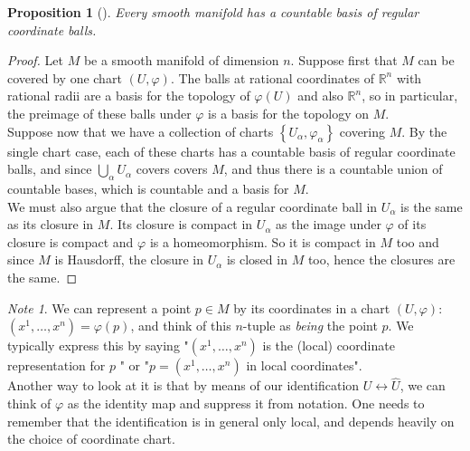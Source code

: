 \documentclass[reqno]{amsart}
\theoremstyle{plain}%
\newtheorem{proposition}[theorem]{Proposition}
\theoremstyle{definition}
\theoremstyle{remark}
\newtheorem*{note}{Note}
\begin{document}
        \begin{proposition}[]\label{regular-coordinate-ball-basis}
        Every smooth manifold has a countable basis of regular coordinate balls.
        \end{proposition}

        \begin{proof}
        Let $M$ be a smooth manifold of dimension $n$. Suppose first that
        $M$ can be covered by one chart $\left( U, \varphi \right) $. 
        The balls at rational coordinates of $\mathbb{R}^{n}$ with rational
        radii are a basis for the topology of $\varphi(U)$ and also
        $\mathbb{R}^{n}$, so in particular, the preimage of these balls under
        $\varphi$ is a basis for the topology on $M$.\\
        Suppose now that we have a collection of charts
        $\left\{ U_{\alpha}, \varphi_{\alpha} \right\} $ covering $M$.
        By the single chart case, each of these charts has a countable basis of
        regular coordinate balls, and since $\bigcup_{\alpha} U_{\alpha}$ covers
        covers $M$, and thus there is a countable union of countable bases, which
        is countable and a basis for $M$.\\
        We must also argue that the closure of a regular coordinate ball in
        $U_{\alpha}$ is the same as its closure in $M$. Its closure is compact in
        $U_{\alpha}$ as the image under $\varphi$ of its closure is compact and
        $\varphi$ is a homeomorphism. So it is compact in $M$ too and since $M$ is Hausdorff,
        the closure  in $U_{\alpha}$ is closed in $M$ too, hence the closures are
        the same.
        \end{proof}

        \begin{note}
         We can represent a point $p \in M$ by its coordinates
         in a chart $\left( U, \varphi \right) $: 
         $\left( x^{1}, \ldots, x^{n} \right) = \varphi(p)$, and think of this
         $n$-tuple as \textit{being} the point $p$. We typically express this by
         saying "$\left( x^{1}, \ldots, x^{n} \right) $ is the (local) coordinate
         representation for $p$ " or "$p = \left( x^{1},\ldots,
         x^{n}\right) $ in local coordinates".\\
         Another way to look at it is that by means of our identification
         $U \leftrightarrow \hat{U}$, we can think of $\varphi$ as the identity map
         and suppress it from notation. One needs to remember that the
         identification is in general only local, and depends heavily on the choice
         of coordinate chart.
        \end{note}
\end{document}
